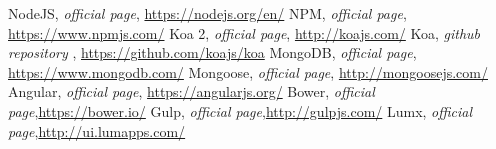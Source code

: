 \begin{thebibliography}{99999}
\singlespace\normalsize

 NodeJS, \textit{ official page}, \url{https://nodejs.org/en/}
 NPM, \textit{ official page}, \url{https://www.npmjs.com/}
 Koa 2, \textit{ official page}, \url{http://koajs.com/}
 Koa, \textit{ github repository }, \url{https://github.com/koajs/koa}
 MongoDB, \textit{ official page}, \url{https://www.mongodb.com/}
 Mongoose, \textit{ official page}, \url{http://mongoosejs.com/}
 Angular, \textit{ official page}, \url{https://angularjs.org/}
 Bower, \textit{ official page},\url{https://bower.io/}
 Gulp, \textit{ official page},\url{http://gulpjs.com/}
 Lumx, \textit{ official page},\url{http://ui.lumapps.com/}
\end{thebibliography}